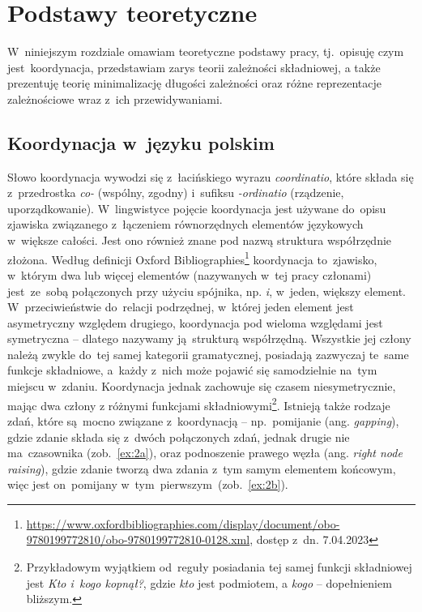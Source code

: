 \documentclass[licencjacka]{pracamgr_Kogni}
\begin{document}
    \chapter{Podstawy teoretyczne}\label{ch:podstawy-teoretyczne}
    W~niniejszym rozdziale omawiam teoretyczne podstawy pracy, tj.~opisuję czym jest~koordynacja, przedstawiam zarys teorii zależności składniowej, a także prezentuję teorię minimalizację długości zależności oraz różne reprezentacje zależnościowe wraz z~ich przewidywaniami.


    \section{Koordynacja w~języku polskim}\label{sec:koordynacja-wjezyku-polskim}
    Słowo koordynacja wywodzi się z~łacińskiego wyrazu \textit{coordinatio}, które składa się z~przedrostka \textit{co-} (wspólny, zgodny) i~sufiksu \textit{-ordinatio} (rządzenie, uporządkowanie).
    W~lingwistyce pojęcie koordynacja jest używane do~opisu zjawiska związanego z~łączeniem równorzędnych elementów językowych w~większe całości.
    Jest ono również znane pod nazwą struktura współrzędnie złożona.
    Według definicji Oxford Bibliographies\footnote{\url{https://www.oxfordbibliographies.com/display/document/obo-9780199772810/obo-9780199772810-0128.xml}, dostęp z~dn. 7.04.2023} koordynacja to~zjawisko, w~którym dwa lub więcej elementów (nazywanych w~tej pracy członami) jest~ze~sobą połączonych przy użyciu spójnika, np. \textit{i}, w~jeden, większy element.
    W~przeciwieństwie do~relacji podrzędnej, w~której jeden element jest asymetryczny względem drugiego, koordynacja pod wieloma względami jest symetryczna -- dlatego nazywamy ją~strukturą współrzędną.
    Wszystkie jej człony należą zwykle do~tej samej kategorii gramatycznej, posiadają zazwyczaj te~same funkcje składniowe, a~każdy z~nich może pojawić się samodzielnie na~tym miejscu w~zdaniu.
    Koordynacja jednak zachowuje się czasem niesymetrycznie, mając dwa człony z różnymi funkcjami składniowymi\footnote{Przykładowym wyjątkiem od~reguły posiadania tej samej funkcji składniowej jest \textit{Kto i~kogo kopnął?}, gdzie \textit{kto} jest podmiotem, a \textit{kogo} -- dopełnieniem bliższym.}.
    Istnieją także rodzaje zdań, które są~mocno związane z~koordynacją -- np.~pomijanie (ang. \textit{gapping}), gdzie zdanie składa się z~dwóch połączonych zdań, jednak drugie nie ma~czasownika (zob.~\ref{ex:2a}), oraz podnoszenie prawego węzła (ang. \textit{right node raising}), gdzie zdanie tworzą dwa zdania z~tym samym elementem końcowym, więc jest on~pomijany w~tym~pierwszym~(zob.~\ref{ex:2b}).
\end{document}
